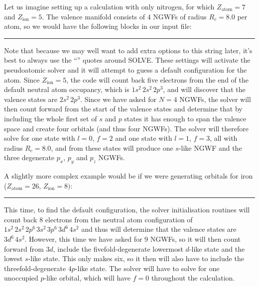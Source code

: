 \documentclass[letterpaper,10pt,english]{sphinxmanual}
\begin{document}
Let us imagine setting up a calculation with only nitrogen, for which
\(Z_{\mathrm{atom}}=7\) and \(Z_{\mathrm{ion}}=5\). The valence
manifold consists of \(4\) NGWFs of radius \(R_{c}=8.0\) per
atom, so we would have the following blocks in our input file:


\bigskip\hrule\bigskip








Note that because we may well want to add extra options to this string
later, it’s best to always use the “” quotes around SOLVE. These
settings will activate the pseudoatomic solver and it will attempt to
guess a default configuration for the atom. Since
\(Z_{\mathrm{ion}}=5\), the code will count back five electrons from
the end of the default neutral atom occupancy, which is
\(1s^{2}\,2s^{2}\,2p^{3}\), and will discover that the valence
states are \(2s^{2}\,2p^{3}\). Since we have asked for \(N=4\)
NGWFs, the solver will then count forward from the start of the valence
states and determine that by including the whole first set of \(s\)
and \(p\) states it has enough to span the valence space and create
four orbitals (and thus four NGWFs). The solver will therefore solve for
one state with \(l=0\), \(f=2\) and one state with \(l=1\),
\(f=3\), all with radius \(R_{c}=8.0\), and from these states
will produce one \(s\)-like NGWF and the three degenerate
\(p_{x}\), \(p_{y}\) and \(p_{z}\) NGWFs.

A slightly more complex example would be if we were generating orbitals
for iron (\(Z_{\mathrm{atom}}=26\), \(Z_{\mathrm{ion}}=8)\):


\bigskip\hrule\bigskip








This time, to find the default configuration, the solver initialisation
routines will count back 8 electrons from the neutral atom configuration
of \(1s^{2}\,2s^{2}\,2p^{6}\,3s^{2}\,3p^{6}\,3d^{6}\,4s^{2}\) and
thus will determine that the valence states are \(3d^{6}\,4s^{2}\).
However, this time we have asked for 9 NGWFs, so it will then count
forward from \(3d\), include the fivefold-degenerate lowermost
\(d\)-like state and the lowest \(s\)-like state. This only
makes six, so it then will also have to include the threefold-degenerate
\(4p\)-like state. The solver will have to solve for one unoccupied
\(p\)-like orbital, which will have \(f=0\) throughout the
calculation.
\end{document}
